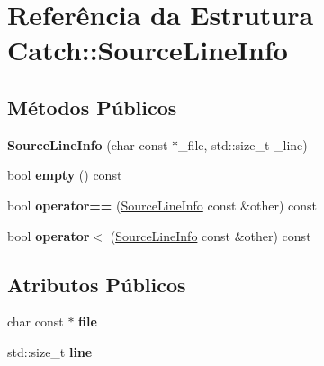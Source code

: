 \hypertarget{structCatch_1_1SourceLineInfo}{}\section{Referência da Estrutura Catch\+:\+:Source\+Line\+Info}
\label{structCatch_1_1SourceLineInfo}
\subsection*{Métodos Públicos}
\begin{DoxyCompactItemize}
\item 
{\bfseries Source\+Line\+Info} (char const $\ast$\+\_\+file, std\+::size\+\_\+t \+\_\+line)\hypertarget{structCatch_1_1SourceLineInfo_a6218cb890337d37f708ea94063958940}{}\label{structCatch_1_1SourceLineInfo_a6218cb890337d37f708ea94063958940}

\item 
bool {\bfseries empty} () const \hypertarget{structCatch_1_1SourceLineInfo_a9a25ffc0640d1a3dd0c9b7e5fcbba7b9}{}\label{structCatch_1_1SourceLineInfo_a9a25ffc0640d1a3dd0c9b7e5fcbba7b9}

\item 
bool {\bfseries operator==} (\hyperlink{structCatch_1_1SourceLineInfo}{Source\+Line\+Info} const \&other) const \hypertarget{structCatch_1_1SourceLineInfo_af0854821b1abfda52796ef0f1294b050}{}\label{structCatch_1_1SourceLineInfo_af0854821b1abfda52796ef0f1294b050}

\item 
bool {\bfseries operator$<$} (\hyperlink{structCatch_1_1SourceLineInfo}{Source\+Line\+Info} const \&other) const \hypertarget{structCatch_1_1SourceLineInfo_a581c02d683808232168bfc2e775c3554}{}\label{structCatch_1_1SourceLineInfo_a581c02d683808232168bfc2e775c3554}

\end{DoxyCompactItemize}
\subsection*{Atributos Públicos}
\begin{DoxyCompactItemize}
\item 
char const $\ast$ {\bfseries file}\hypertarget{structCatch_1_1SourceLineInfo_ad65537703e9f08c1fa7777fbc3f0c617}{}\label{structCatch_1_1SourceLineInfo_ad65537703e9f08c1fa7777fbc3f0c617}

\item 
std\+::size\+\_\+t {\bfseries line}\hypertarget{structCatch_1_1SourceLineInfo_a841e5d696c7b9cde24e45e61dd979c77}{}\label{structCatch_1_1SourceLineInfo_a841e5d696c7b9cde24e45e61dd979c77}

\end{DoxyCompactItemize}


